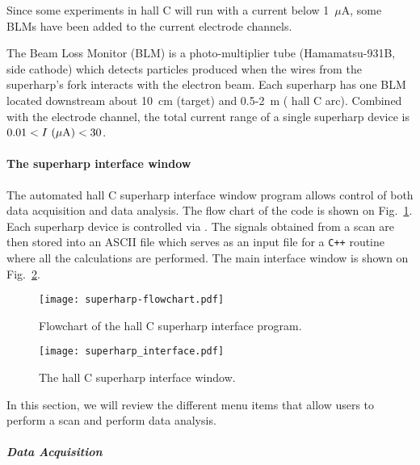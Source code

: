 {Since some experiments in hall C will run with a current below
1~$\mu$A,  some BLMs have been added to the
current electrode channels.

The Beam Loss Monitor (BLM) is a photo-multiplier tube (Hamamatsu-931B, side cathode) which detects
particles produced when the wires from the superharp's fork interacts
with the  electron beam. Each
superharp has one BLM located downstream about 10~cm (target) and
0.5-2~m ( hall C arc). Combined with
the electrode channel, the total current range of a single superharp device is
$0.01 < I~(\mu {\rm A}) < 30$.

\paragraph{The superharp interface window}\label{interface}

The automated hall C superharp interface window program allows control of both
data acquisition and data analysis. The flow chart of the code is shown on Fig.~\ref{figure:flow_chart}. 
Each superharp device is controlled via 
. The
signals obtained from a scan are then
stored into an ASCII file which serves as an input file for a {\tt C++} routine where all the
calculations are performed. The main interface window is shown on Fig.~\ref{figure:interface}.

\begin{figure}[!hbt]
\begin{center}
\texttt{[image: superharp-flowchart.pdf]}
\caption{Flowchart of the hall C superharp interface program.}\label{figure:flow_chart}
\end{center}
\end{figure}

\begin{figure}[!hbt]
\begin{center}
\texttt{[image: superharp\_interface.pdf]}
\caption{The hall C superharp interface window.}\label{figure:interface}
\end{center}
\end{figure}

In this section, we will review the different menu items that allow users to perform a scan and
perform data analysis.

	\subparagraph{Data Acquisition}\label{daq}

}
